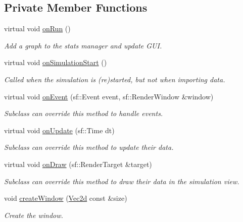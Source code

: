 \subsection*{Private Member Functions}
\begin{DoxyCompactItemize}
\item 
virtual void \hyperlink{class_application_af48ce2f324313699257c164dddb3b920}{on\-Run} ()
\begin{DoxyCompactList}\small\item\em Add a graph to the stats manager and update G\-U\-I. \end{DoxyCompactList}\item 
virtual void \hyperlink{class_application_a811e40a46923de963bbc87d54097ed54}{on\-Simulation\-Start} ()
\begin{DoxyCompactList}\small\item\em Called when the simulation is (re)started, but not when importing data. \end{DoxyCompactList}\item 
virtual void \hyperlink{class_application_ae6ea28bafe249f7005aa143f36651342}{on\-Event} (sf\-::\-Event event, sf\-::\-Render\-Window \&window)
\begin{DoxyCompactList}\small\item\em Subclass can override this method to handle events. \end{DoxyCompactList}\item 
virtual void \hyperlink{class_application_adfc65fcc3dda8aab7483d01f8b2b1e48}{on\-Update} (sf\-::\-Time dt)
\begin{DoxyCompactList}\small\item\em Subclass can override this method to update their data. \end{DoxyCompactList}\item 
virtual void \hyperlink{class_application_ac35bfbd486eb47fdd2b5d731962c6724}{on\-Draw} (sf\-::\-Render\-Target \&target)
\begin{DoxyCompactList}\small\item\em Subclass can override this method to draw their data in the simulation view. \end{DoxyCompactList}\item 
void \hyperlink{class_application_a8634280ed0a49eb67c2698a076f51a36}{create\-Window} (\hyperlink{class_vec2d}{Vec2d} const \&size)
\begin{DoxyCompactList}\small\item\em Create the window. \end{DoxyCompactList}\item 

\end{DoxyCompactItemize}
